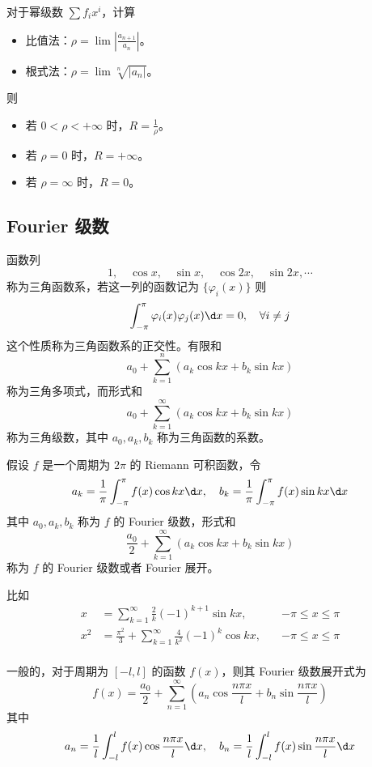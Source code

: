 对于幂级数 $\sum f_i x^i$，计算
\begin{itemize}
	\item 比值法：$\rho = \lim \left| \frac{a_{n+1}}{a_n} \right|$。
	\item 根式法：$\rho = \lim \sqrt[n]{|a_n|}$。
\end{itemize}
则
\begin{itemize}
	\item 若 $0 < \rho < +\infty$ 时，$R = \frac{1}{\rho}$。
	\item 若 $\rho = 0$ 时，$R = +\infty$。
	\item 若 $\rho = \infty$ 时，$R = 0$。
\end{itemize}

\subsection{Fourier 级数}

函数列
\[ 1, \quad \cos x, \quad \sin x, \quad \cos 2x, \quad \sin 2x , \cdots \]
称为三角函数系，若这一列的函数记为 $\{\varphi_i(x)\}$ 则
\[ \int_{-\pi}^{\pi} \varphi_i(x) \varphi_j(x) \d x = 0, \quad \forall i \neq j \]
这个性质称为三角函数系的正交性。有限和
\[ a_0 + \sum_{k=1}^n (a_k \cos kx + b_k \sin kx) \]
称为三角多项式，而形式和
\[ a_0 + \sum_{k=1}^\infty (a_k \cos kx + b_k \sin kx) \]
称为三角级数，其中 $a_0, a_k, b_k$ 称为三角函数的系数。

\begin{definition}[Fourier 级数]
	假设 $f$ 是一个周期为 $2\pi$ 的 Riemann 可积函数，令
	\[ a_k = \frac{1}{\pi} \int_{-\pi}^{\pi} f(x) \cos kx \d x, \quad b_k = \frac{1}{\pi} \int_{-\pi}^{\pi} f(x) \sin k x \d x \]
	其中 $a_0, a_k, b_k$ 称为 $f$ 的 Fourier 级数，形式和
	\[ \frac{a_0}{2} + \sum_{k=1}^\infty (a_k \cos k x+ b_k \sin k x) \]
	称为 $f$ 的 Fourier 级数或者 Fourier 展开。
\end{definition}

比如
\[ \begin{aligned}
		x   & = \sum_{k=1}^{\infty} \frac{2}{k} (-1)^{k+1} \sin k x, \quad                   & -\pi \leqslant x \leqslant \pi \\
		x^2 & = \frac{\pi^2}{3} + \sum_{k=1}^{\infty} \frac{4}{k^2} (-1)^{k} \cos k x, \quad & -\pi \leqslant x \leqslant \pi \\
	\end{aligned} \]

一般的，对于周期为 $[-l,l]$ 的函数 $f(x)$，则其 Fourier 级数展开式为
\[ f(x) = \frac{a_0}{2} + \sum_{n=1}^{\infty} \left( a_n \cos \frac{n \pi x}{l} + b_n \sin \frac{n \pi x}{l} \right) \]
其中
\[ a_n = \frac{1}{l} \int_{-l}^{l} f(x) \cos \frac{n \pi x}{l} \d x, \quad b_n = \frac{1}{l} \int_{-l}^{l} f(x) \sin \frac{n \pi x}{l} \d x  \]


